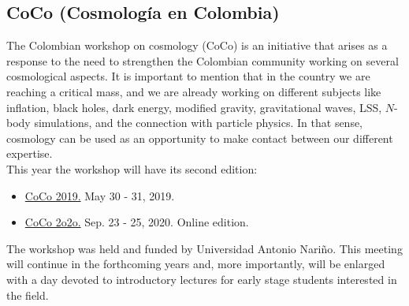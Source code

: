 \documentclass[a4paper,11pt]{article}
\begin{document}
\subsection*{CoCo (Cosmología en Colombia)}
The Colombian workshop on cosmology (CoCo) is an initiative that arises as a response  to the need to strengthen the Colombian community working on several cosmological aspects. It is important to mention that in the country we are reaching a critical mass, and we are already working on different subjects like inflation, black holes, dark energy, modified gravity, gravitational waves, LSS, $N$-body simulations, and the connection with particle physics. In that sense, cosmology can be used as an opportunity to make contact between our different expertise.\\
This year the workshop will have its second edition:
\begin{itemize}
\item 
\href{https://indico.cern.ch/e/coco2019}{CoCo 2019.}
May 30 - 31, 2019. %
%
\item
\href{https://indico.cern.ch/e/coco2020}{CoCo 2o2o.}
Sep. 23 - 25, 2020. Online edition. 
\end{itemize}

The workshop was held and funded by Universidad Antonio Nariño. 
This meeting will continue in the forthcoming years and, more importantly, will be enlarged with a day devoted to introductory lectures for early stage students interested in the field.




\end{document}
